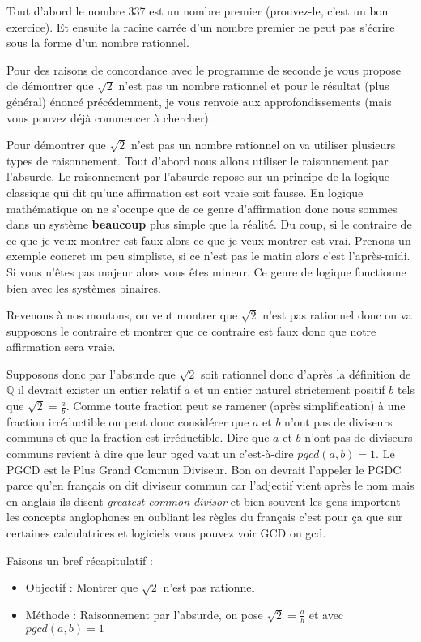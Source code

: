\documentclass[a4paper, 11pt, twoside]{article}
\newcommand{\E}[1]{\mathbb{#1}}
\begin{document}
Tout d'abord le nombre 337 est un nombre premier (prouvez-le, c'est
un bon exercice). Et ensuite la racine carrée d'un nombre premier
ne peut pas s'écrire sous la forme d'un nombre rationnel.

Pour des raisons de concordance avec le programme de seconde je
vous propose de démontrer que \(\sqrt{2}\) n'est pas un nombre
rationnel et pour le résultat (plus général) énoncé précédemment,
je vous renvoie aux approfondissements (mais vous pouvez déjà
commencer à chercher).

Pour démontrer que \(\sqrt{2}\) n'est pas un nombre rationnel on va
utiliser plusieurs types de raisonnement. Tout d'abord nous allons
utiliser le raisonnement par l'absurde. Le raisonnement par
l'absurde repose sur un principe de la logique classique qui dit
qu'une affirmation est soit vraie soit fausse. En logique
mathématique on ne s'occupe que de ce genre d'affirmation donc nous
sommes dans un système \textbf{beaucoup} plus simple que la réalité. Du
coup, si le contraire de ce que je veux montrer est faux alors ce
que je veux montrer est vrai. Prenons un exemple concret un peu
simpliste, si ce n'est pas le matin alors c'est l'après-midi. Si
vous n'êtes pas majeur alors vous êtes mineur. Ce genre de logique
fonctionne bien avec les systèmes binaires.

Revenons à nos moutons, on veut montrer que \(\sqrt{2}\) n'est pas
rationnel donc on va supposons le contraire et montrer que ce
contraire est faux donc que notre affirmation sera vraie.

Supposons donc par l'absurde que \(\sqrt{2}\) soit rationnel donc
d'après la définition de \(\E{Q}\) il devrait exister un entier
relatif \(a\) et un entier naturel strictement positif \(b\) tels que
\(\sqrt{2} = \frac{a}{b}\). Comme toute fraction peut se ramener
(après simplification) à une fraction irréductible on peut donc
considérer que \(a\) et \(b\) n'ont pas de diviseurs communs et que la
fraction est irréductible. Dire que \(a\) et \(b\) n'ont pas de
diviseurs communs revient à dire que leur pgcd vaut un c'est-à-dire
\(pgcd(a, b) = 1\). Le PGCD est le Plus Grand Commun Diviseur. Bon on
devrait l'appeler le PGDC parce qu'en français on dit diviseur
commun car l'adjectif vient après le nom mais en anglais ils disent
\emph{greatest common divisor} et bien souvent les gens importent les
concepts anglophones en oubliant les règles du français c'est pour
ça que sur certaines calculatrices et logiciels vous pouvez voir
GCD ou gcd.

Faisons un bref récapitulatif :
\begin{itemize}
\item Objectif : Montrer que \(\sqrt{2}\) n'est pas rationnel
\item Méthode : Raisonnement par l'absurde, on pose \(\sqrt{2} =
     \frac{a}{b}\) et avec \(pgcd(a, b) = 1\)
\end{itemize}
\end{document}

